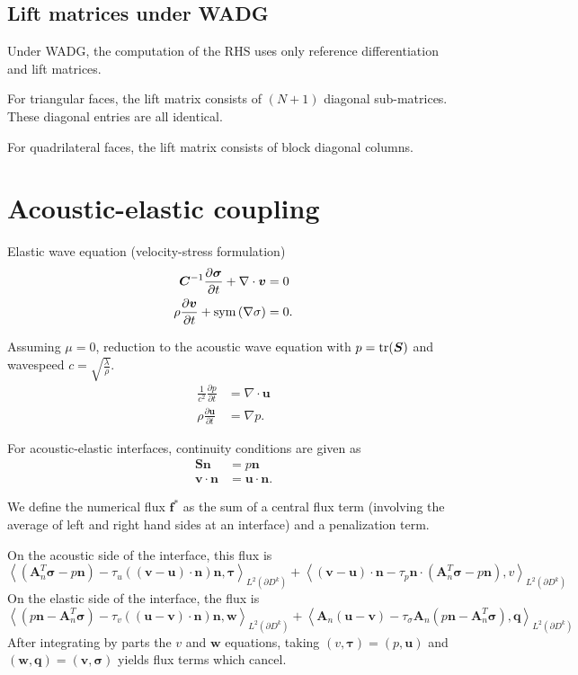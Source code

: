 \documentclass{siamart0216}
\newcommand{\pd}[2]{\frac{\partial#1}{\partial#2}}
\newcommand{\LRp}[1]{\left( #1 \right)}
\newcommand{\LRa}[1]{\left\langle #1 \right\rangle}
\newcommand{\Grad} {\ensuremath{\nabla}}
\newcommand{\Div} {\ensuremath{\nabla\cdot}}
\newcommand{\Ldk}{L^2\LRp{\partial D^k}}
\begin{document}
\subsection{Lift matrices under WADG}

Under WADG, the computation of the RHS uses only reference differentiation and lift matrices.  

For triangular faces, the lift matrix consists of $(N+1)$ diagonal sub-matrices.  These diagonal entries are all identical.  

For quadrilateral faces, the lift matrix consists of block diagonal columns.  

\section{Acoustic-elastic coupling}

Elastic wave equation (velocity-stress formulation)
\begin{align*}
\bm{C}^{-1}\pd{\bm{\sigma}}{t} + \Div\bm{v} &= 0\\
\rho\pd{\bm{v}}{t} + {\rm sym}\LRp{\Grad \sigma} &= 0.
\end{align*}

Assuming $\mu = 0$, reduction to the acoustic wave equation with $p = {\rm tr}(\bm{S})$ and wavespeed $c = \sqrt{\frac{\lambda}{\rho}}$.
\begin{align*}
\frac{1}{c^2}\pd{p}{t} &= \Div\bm{u}\\
\rho\pd{\bm{u}}{t} &= \Grad p.
\end{align*}

For acoustic-elastic interfaces, continuity conditions are given as
\begin{align*}
\bm{S}\bm{n} &= p\bm{n}\\
\bm{v}\cdot \bm{n} &= \bm{u}\cdot \bm{n}.
\end{align*}

We define the numerical flux $\bm{f}^*$ as the sum of a central flux term (involving the average of left and right hand sides at an interface) and a penalization term.  

On the acoustic side of the interface, this flux is
\[
\LRa{\LRp{\bm{A}_n^T\bm{\sigma}-p\bm{n}} - \tau_u\LRp{\LRp{\bm{v}-\bm{u}}\cdot\bm{n}}\bm{n},\bm{\tau}}_{\Ldk}
+
\LRa{\LRp{\bm{v}-\bm{u}}\cdot\bm{n} - \tau_p\bm{n}\cdot\LRp{\bm{A}_n^T\bm{\sigma}-p\bm{n}},v}_{\Ldk}
\]
On the elastic side of the interface, the flux is
\[
\LRa{\LRp{p\bm{n}-\bm{A}_n^T\bm{\sigma}} - \tau_v \LRp{\LRp{\bm{u}-\bm{v}}\cdot\bm{n}}\bm{n},\bm{w}}_{\Ldk}
+
\LRa{\bm{A}_n\LRp{\bm{u}-\bm{v}} - \tau_{\sigma}\bm{A}_n\LRp{p\bm{n}-\bm{A}_n^T\bm{\sigma}},\bm{q}}_{\Ldk}
\]
After integrating by parts the $v$ and $\bm{w}$ equations, taking $(v,\bm{\tau}) = (p,\bm{u})$ and $(\bm{w},\bm{q})=(\bm{v},\bm{\sigma})$ yields flux terms which cancel.  
\end{document}
